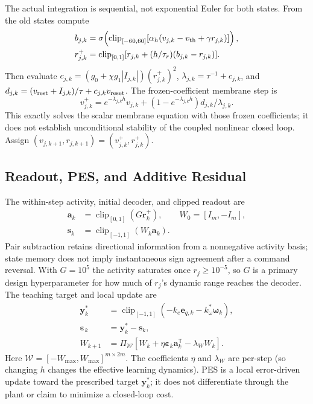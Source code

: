 \documentclass[letterpaper, 10 pt, conference]{ieeeconf}
\newcommand{\T}{^{\mathsf T}}
\newcommand{\clip}{\operatorname{clip}}
\begin{document}
The actual integration is sequential, not exponential Euler for both
states. From the old states compute
\begin{align}
 b_{j,k}&=\sigma\!\left(\clip_{[-60,60]}
       [\alpha_h(v_{j,k}-v_{\rm th}+\gamma r_{j,k})]\right),\\
 r_{j,k}^{+}&=\clip_{[0,1]}
       [r_{j,k}+(h/\tau_r)(b_{j,k}-r_{j,k})].
 \label{eq:gate_step}
\end{align}
Then evaluate $c_{j,k}=(g_0+\chi g_1|I_{j,k}|)(r_{j,k}^{+})^2$,
$\lambda_{j,k}=\tau^{-1}+c_{j,k}$, and
$d_{j,k}=(v_{\rm rest}+I_{j,k})/\tau+c_{j,k}v_{\rm reset}$. The
frozen-coefficient membrane step is
\begin{equation}
 v_{j,k}^{+}=e^{-\lambda_{j,k}h}v_{j,k}
       +(1-e^{-\lambda_{j,k}h})d_{j,k}/\lambda_{j,k}.
 \label{eq:mem_step}
\end{equation}
This exactly solves the scalar membrane equation with those frozen
coefficients; it does not establish unconditional stability of the coupled
nonlinear closed loop. Assign $(v_{j,k+1},r_{j,k+1})=(v_{j,k}^{+},r_{j,k}^{+})$.

\subsection{Readout, PES, and Additive Residual}
The within-step activity, initial decoder, and clipped readout are
\begin{equation}
 \begin{aligned}
 \bm a_k&=\clip_{[0,1]}(G\bm r_k^+),\qquad W_0=[I_m,-I_m],\\
 \bm s_k&=\clip_{[-1,1]}(W_k\bm a_k).
 \end{aligned}
 \label{eq:readout}
\end{equation}
Pair subtraction retains directional information from a nonnegative
activity basis; state memory does not imply instantaneous sign agreement
after a command reversal. With $G=10^5$ the activity saturates once
$r_j\ge10^{-5}$, so $G$ is a primary design hyperparameter for how much of
$r_j$'s dynamic range reaches the decoder. The teaching target and local update are
\begin{align}
 \bm y_k^*&=\clip_{[-1,1]}(-k_e\bm e_{q,k}-k_\omega^*\bm\omega_k),\\
 \bm\varepsilon_k&=\bm y_k^*-\bm s_k,\\
 W_{k+1}&=\Pi_{\mathcal W}
       [W_k+\eta\bm\varepsilon_k\bm a_k\T-\lambda_W W_k].
 \label{eq:pes}
\end{align}
Here $\mathcal W=[-W_{\max},W_{\max}]^{m\times2m}$. The coefficients $\eta$ and $\lambda_W$ are per-step (so changing $h$ changes the effective learning dynamics). PES is a local error-driven update toward the prescribed target $\bm y_k^*$; it does not differentiate through the plant or claim to minimize a closed-loop cost.
\end{document}
